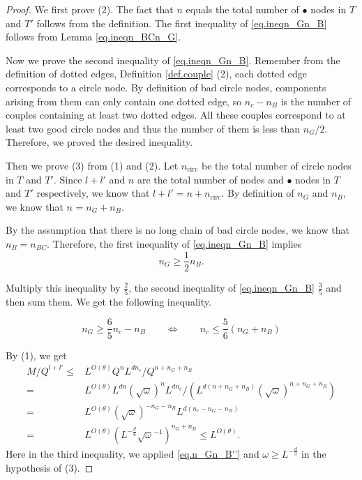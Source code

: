 \begin{proof} We first prove (2). The fact that $n$ equals the total number of $\bullet$ nodes in $T$ and $T'$ follows from the definition. The first inequality of \eqref{eq.ineqn_Gn_B} follows from Lemma \ref{eq.ineqn_BCn_G}. 
 
    Now we prove the second inequality of \eqref{eq.ineqn_Gn_B}. Remember from the definition of dotted edges, Definition \ref{def.couple} (2), each dotted edge corresponds to a circle node. By definition of bad circle nodes, components arising from them can only contain one dotted edge, so $n_c - n_B$ is the number of couples containing at least two dotted edges. All these couples correspond to at least two good circle nodes and thus the number of them is less than $n_G/2$. Therefore, we proved the desired inequality.
    
    Then we prove (3) from (1) and (2). Let $n_{\text{circ}}$ be the total number of circle nodes in $T$ and $T'$. Since $l+l'$ and $n$ are the total number of nodes and $\bullet$ nodes in $T$ and $T'$ respectively, we know that $l+l' = n + n_{\text{circ}}$. By definition of $n_G$ and $n_B$, we know that $n_{} = n_{G} + n_{B}$. 
    
    By the assumption that there is no long chain of bad circle nodes, we know that $n_{B} = n_{BC}$. Therefore, the first inequality of \eqref{eq.ineqn_Gn_B} implies 
    \begin{equation}\label{eq.n_Gn_B'}
     n_{G} \ge \frac{1}{2}n_{B}.
    \end{equation}
    
    Multiply this inequality by $\frac{2}{5}$, the second inequality of \eqref{eq.ineqn_Gn_B} $\frac{3}{5}$ and then sum them. We get the following inequality.
    
    \begin{equation}\label{eq.n_Gn_B''}
     n_{G} \ge \frac{6}{5}n_c - n_{B}\qquad \Leftrightarrow\qquad n_c \le \frac{5}{6} (n_{G} + n_{B}) 
    \end{equation}
    
    By (1), we get 
    \begin{equation}
     \begin{split}
     M/Q^{l+l'}\leq& L^{O(\theta)} Q^{n} L^{dn_c}/Q^{n+n_G+n_B}
     \\
     =& L^{O(\theta)} L^{dn} (\sqrt{\omega})^{n}L^{dn_c}/(L^{d(n+n_G+n_B)}(\sqrt{\omega})^{n+n_G+n_B})
     \\
     =& L^{O(\theta)} (\sqrt{\omega})^{-n_G-n_B}L^{d(n_c-n_G-n_B)}
     \\
     =& L^{O(\theta)} (L^{-\frac{d}{6}}\sqrt{\omega}^{-1})^{n_G+n_B}\le L^{O(\theta)}.
     \end{split}
    \end{equation}
    Here in the third inequality, we applied \eqref{eq.n_Gn_B''} and $\omega \ge L^{-\frac{d}{3}}$ in the hypothesis of (3).
    

\end{proof}
